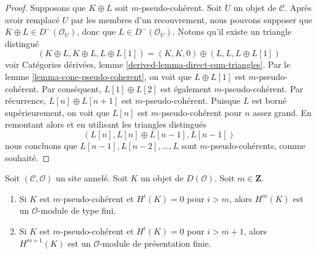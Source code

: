 \begin{proof}
Supposons que $K \oplus L$ soit $m$-pseudo-cohérent. Soit $U$ un objet de
$\mathcal{C}$. Après avoir remplacé $U$ par les membres d'un recouvrement,
nous pouvons supposer que $K \oplus L \in D^-(\mathcal{O}_U)$, donc que
$L \in D^-(\mathcal{O}_U)$. Notons qu'il existe un triangle distingué
$$
(K \oplus L, K \oplus L, L \oplus L[1]) =
(K, K, 0) \oplus (L, L, L \oplus L[1])
$$
voir Catégories dérivées, lemme
\ref{derived-lemma-direct-sum-triangles}. Par le lemme
\ref{lemma-cone-pseudo-coherent}, on voit que $L \oplus L[1]$ est
$m$-pseudo-cohérent. Par conséquent, $L[1] \oplus L[2]$ est également
$m$-pseudo-cohérent. Par récurrence, $L[n] \oplus L[n + 1]$ est
$m$-pseudo-cohérent. Puisque $L$ est borné supérieurement, on voit que
$L[n]$ est $m$-pseudo-cohérent pour $n$ assez grand. En remontant alors et en
utilisant les triangles distingués
$$
(L[n], L[n] \oplus L[n - 1], L[n - 1])
$$
nous concluons que $L[n - 1], L[n - 2], \ldots, L$ sont
$m$-pseudo-cohérents, comme souhaité.
\end{proof}

\begin{lemma}
\label{lemma-finite-cohomology}
Soit $(\mathcal{C}, \mathcal{O})$ un site annelé. Soit $K$ un objet de
$D(\mathcal{O})$. Soit $m \in \mathbf{Z}$.
\begin{enumerate}
\item Si $K$ est $m$-pseudo-cohérent et $H^i(K) = 0$ pour $i > m$, alors
$H^m(K)$ est un $\mathcal{O}$-module de type fini.
\item Si $K$ est $m$-pseudo-cohérent et $H^i(K) = 0$ pour $i > m + 1$, alors
$H^{m + 1}(K)$ est un $\mathcal{O}$-module de présentation finie.
\end{enumerate}
\end{lemma}

